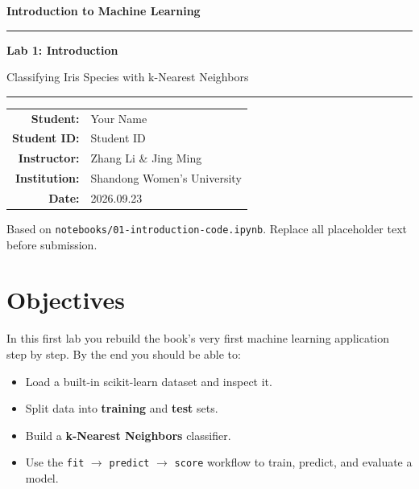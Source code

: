\documentclass[11pt,a4paper]{article}
\newcommand{\Course}{Introduction to Machine Learning}
\newcommand{\LabNo}{Lab 1}
\newcommand{\LabTitle}{Introduction}
\newcommand{\StudentName}{Your Name}          %
\newcommand{\StudentID}{Student ID}           %
\newcommand{\DueDate}{2026.09.23}                 %
\newcommand{\Instructor}{Zhang Li \& Jing Ming}
\newcommand{\Institution}{Shandong Women's University}
\begin{document}
\begin{titlepage}
\centering
\vspace*{2cm}
{\LARGE\bfseries \Course\par}
\vspace{0.6cm}
{\color{accent}\rule{\linewidth}{1.5pt}}\par
\vspace{0.5cm}
{\Huge\bfseries \LabNo: \LabTitle\par}
\vspace{0.3cm}
{\large Classifying Iris Species with k-Nearest Neighbors\par}
\vspace{0.4cm}
{\color{accent}\rule{\linewidth}{1.5pt}}\par
\vspace{2.3cm}

\begin{tabular}{rl}
  \textbf{Student:}    & \StudentName \\[4pt]
  \textbf{Student ID:} & \StudentID \\[4pt]
  \textbf{Instructor:} & \Instructor \\[4pt]
  \textbf{Institution:}& \Institution \\[4pt]
  \textbf{Date:}       & \DueDate \\
\end{tabular}

\vfill
{\color{cmt}\small Based on \texttt{notebooks/01-introduction-code.ipynb}.
Replace all placeholder text before submission.}
\end{titlepage}

\tableofcontents
\newpage

\section{Objectives}
In this first lab you rebuild the book's very first machine learning
application step by step. By the end you should be able to:
\begin{itemize}[leftmargin=*]
  \item Load a built-in scikit-learn dataset and inspect it.
  \item Split data into \textbf{training} and \textbf{test} sets.
  \item Build a \textbf{k-Nearest Neighbors} classifier.
  \item Use the \lstinline|fit| $\rightarrow$ \lstinline|predict| $\rightarrow$
        \lstinline|score| workflow to train, predict, and evaluate a model.
\end{itemize}
\end{document}
